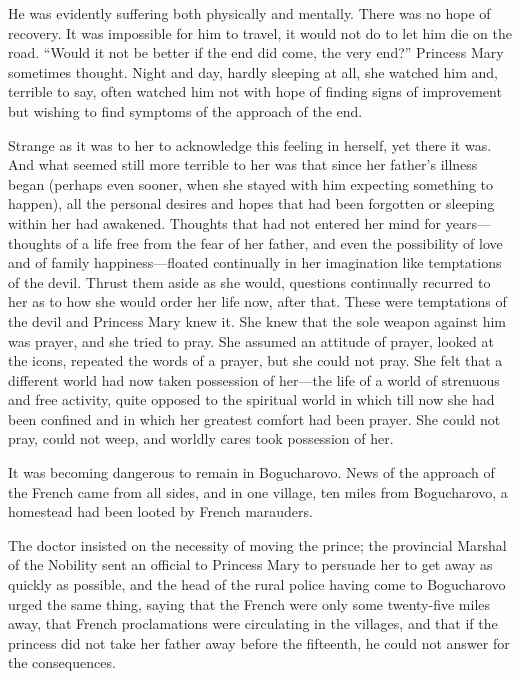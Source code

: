 He was evidently suffering both physically and mentally. There
was no hope of recovery. It was impossible for him to travel, it
would not do to let him die on the road. ``Would it not be better
if the end did come, the very end?'' Princess Mary sometimes
thought. Night and day, hardly sleeping at all, she watched him
and, terrible to say, often watched him not with hope of finding
signs of improvement but wishing to find symptoms of the approach
of the end.

Strange as it was to her to acknowledge this feeling in herself,
yet there it was. And what seemed still more terrible to her was
that since her father's illness began (perhaps even sooner, when
she stayed with him expecting something to happen), all the
personal desires and hopes that had been forgotten or sleeping
within her had awakened. Thoughts that had not entered her mind
for years---thoughts of a life free from the fear of her father,
and even the possibility of love and of family
happiness---floated continually in her imagination like
temptations of the devil. Thrust them aside as she would,
questions continually recurred to her as to how she would order
her life now, after that.  These were temptations of the devil
and Princess Mary knew it. She knew that the sole weapon against
him was prayer, and she tried to pray. She assumed an attitude of
prayer, looked at the icons, repeated the words of a prayer, but
she could not pray. She felt that a different world had now taken
possession of her---the life of a world of strenuous and free
activity, quite opposed to the spiritual world in which till now
she had been confined and in which her greatest comfort had been
prayer. She could not pray, could not weep, and worldly cares
took possession of her.

It was becoming dangerous to remain in Bogucharovo. News of the
approach of the French came from all sides, and in one village,
ten miles from Bogucharovo, a homestead had been looted by French
marauders.

The doctor insisted on the necessity of moving the prince; the
provincial Marshal of the Nobility sent an official to Princess
Mary to persuade her to get away as quickly as possible, and the
head of the rural police having come to Bogucharovo urged the
same thing, saying that the French were only some twenty-five
miles away, that French proclamations were circulating in the
villages, and that if the princess did not take her father away
before the fifteenth, he could not answer for the consequences.


